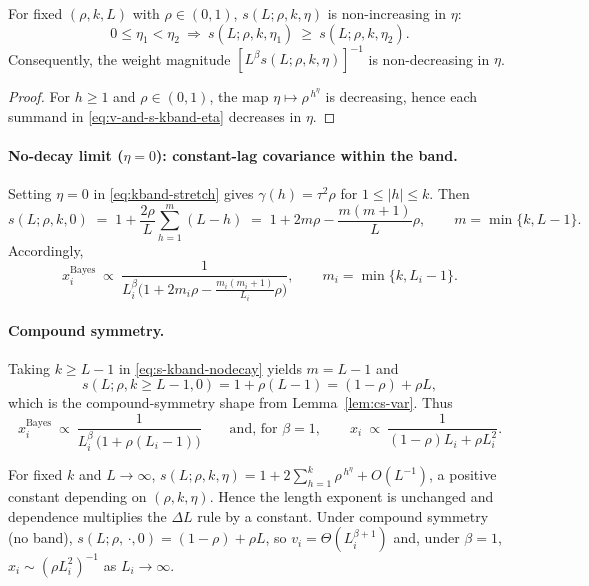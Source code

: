 \begin{lemma}\label{lem:mono-eta}
For fixed $(\rho,k,L)$ with $\rho\in(0,1)$, $s(L;\rho,k,\eta)$ is non-increasing in $\eta$:
\[
0\le \eta_1<\eta_2 \ \Rightarrow\ s(L;\rho,k,\eta_1)\ \ge\ s(L;\rho,k,\eta_2).
\]
Consequently, the weight magnitude $[L^{\beta}s(L;\rho,k,\eta)]^{-1}$ is non-decreasing in $\eta$.
\end{lemma}

\begin{proof}
For $h\ge 1$ and $\rho\in(0,1)$, the map $\eta\mapsto \rho^{\,h^{\eta}}$ is decreasing, hence each summand in \eqref{eq:v-and-s-kband-eta} decreases in $\eta$.
\end{proof}

\paragraph{No-decay limit ($\eta=0$): constant-lag covariance within the band.}
Setting $\eta=0$ in \eqref{eq:kband-stretch} gives $\gamma(h)=\tau^2\rho$ for $1\le|h|\le k$. Then
\begin{equation}
s(L;\rho,k,0)
\;=\;
1+\frac{2\rho}{L}\sum_{h=1}^{m}(L-h)
\;=\;
1+2m\rho-\frac{m(m+1)}{L}\rho,
\qquad m=\min\{k,L-1\}.
\label{eq:s-kband-nodecay}
\end{equation}
Accordingly,
\begin{equation}
x_i^{\mathrm{Bayes}}
\ \propto\
\frac{1}{L_i^{\beta}\big(1+2m_i\rho-\frac{m_i(m_i+1)}{L_i}\rho\big)},
\qquad m_i=\min\{k,L_i-1\}.
\label{eq:weights-kband-nodecay}
\end{equation}

\paragraph{Compound symmetry.}
Taking $k\ge L-1$ in \eqref{eq:s-kband-nodecay} yields
\(
m=L-1
\)
and
\begin{equation}
s(L;\rho,k\!\ge\!L-1,0)
=
1+\rho(L-1)
=
(1-\rho)+\rho L,
\label{eq:s-compound}
\end{equation}
which is the compound-symmetry shape from Lemma~\ref{lem:cs-var}. Thus
\begin{equation}
x_i^{\mathrm{Bayes}}
\ \propto\
\frac{1}{L_i^{\beta}\,\big(1+\rho(L_i-1)\big)}
\qquad\text{and, for }\beta=1,\qquad
x_i\ \propto\ \frac{1}{(1-\rho)L_i+\rho L_i^2}.
\label{eq:weights-compound}
\end{equation}

\begin{remark}[Asymptotics]
For fixed $k$ and $L\to\infty$,
\(
s(L;\rho,k,\eta)=1+2\sum_{h=1}^{k}\rho^{\,h^{\eta}}+O(L^{-1})
\),
a positive constant depending on $(\rho,k,\eta)$. Hence the length exponent is unchanged and dependence multiplies the $\Delta L$ rule by a constant. Under compound symmetry (no band), $s(L;\rho,\,\cdot,0)=(1-\rho)+\rho L$, so $v_i=\Theta(L_i^{\beta+1})$ and, under $\beta=1$, $x_i\sim ( \rho L_i^2 )^{-1}$ as $L_i\to\infty$.
\end{remark}


